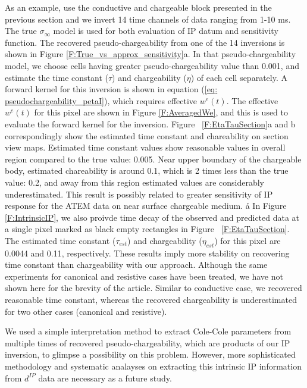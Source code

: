 \documentclass[extra,mreferee]{gji}
\newcommand{\siginf}{\sigma_\infty}
\newcommand{\dip}{d^{IP}}
\begin{document}
As an example, use the conductive and chargeable block presented in the previous section and we invert 14 time channels of data ranging from 1-10 ms.  The true $\siginf$ model is used  for both evaluation of IP datum and sensitivity function. The recovered pseudo-chargeability from one of the 14 inversions is shown in Figure \ref{F:True_vs_approx_sensitivity}a. In that pseudo-chargeability model, we choose cells having greater pseudo-chargeability value than 0.001, and estimate the time constant ($\tau$) and chargeability ($\eta$) of each cell separately. 
A forward kernel for this inversion is shown in equation (\ref{eq: pseudochargeability_petaI}), which requires effective $w^e(t)$. 
The effective $w^e(t)$ for this pixel are shown in Figure \ref{F:AveragedWe}, and this is used to evaluate the forward kernel for the inversion.
Figure ~\ref{F:EtaTauSection}a and b correspondingly show the estimated time constant and chareability on section view maps.
Estimated time constant values show reasonable values in overall region compared to the true value: 0.005. 
Near upper boundary of the chargeable body, estimated chareability is around 0.1, which is 2 times less than the true value: 0.2, and away from this region estimated values are considerably underestimated. 
This result is possibly related to greater sensitivity of IP response for the ATEM data on near surface chargeable medium. å
In Figure \ref{F:IntrinsicIP}, we also proivde time decay of the observed and predicted data at a single pixel marked as black empty rectangles in Figure ~\ref{F:EtaTauSection}.
The estimated time constant ($\tau_{est}$) and chargeability ($\eta_{est}$) for this pixel are 0.0044 and 0.11, respectively. 
These results imply more stability on recovering time constant than chargeability with our approach. Although the same experiments for canonical and resistive cases have been treated, we have not shown here for the brevity of the article.
Similar to conductive case, we recovered reasonable time constant, whereas the recovered chargeability is underestimated for two other cases (canonical and resistive). 

We used a simple interpretation method to extract Cole-Cole parameters from multiple times of recovered pseudo-chargeability, which are products of our IP inversion, to glimpse a possibility on this problem. 
However, more sophisticated methodology and systematic analayses on extracting this intrinsic IP information from $\dip$ data are necessary as a future study. 
\end{document}
